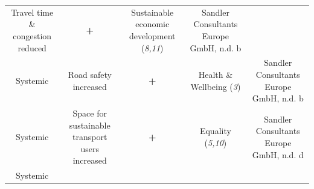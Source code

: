 \documentclass[
]{book}
\begin{document}
\begin{longtable}[]{@{}ccccc@{}}
\begin{minipage}[t]{0.16\columnwidth}
Travel time \& congestion reduced\strut
\end{minipage} & \begin{minipage}[t]{0.17\columnwidth}\centering
\textbf{+}\strut
\end{minipage} & \begin{minipage}[t]{0.17\columnwidth}\centering
Sustainable economic development (\emph{8,11})\strut
\end{minipage} & \begin{minipage}[t]{0.17\columnwidth}\centering
Sandler Consultants Europe GmbH, n.d. b\strut
\end{minipage}\tabularnewline
\begin{minipage}[t]{0.17\columnwidth}\centering
Systemic\strut
\end{minipage} & \begin{minipage}[t]{0.16\columnwidth}\centering
Road safety increased\strut
\end{minipage} & \begin{minipage}[t]{0.17\columnwidth}\centering
\textbf{+}\strut
\end{minipage} & \begin{minipage}[t]{0.17\columnwidth}\centering
Health \& Wellbeing (\emph{3})\strut
\end{minipage} & \begin{minipage}[t]{0.17\columnwidth}\centering
Sandler Consultants Europe GmbH, n.d. b\strut
\end{minipage}\tabularnewline
\begin{minipage}[t]{0.17\columnwidth}\centering
Systemic\strut
\end{minipage} & \begin{minipage}[t]{0.16\columnwidth}\centering
Space for sustainable transport users increased\strut
\end{minipage} & \begin{minipage}[t]{0.17\columnwidth}\centering
\textbf{+}\strut
\end{minipage} & \begin{minipage}[t]{0.17\columnwidth}\centering
Equality (\emph{5,10})\strut
\end{minipage} & \begin{minipage}[t]{0.17\columnwidth}\centering
Sandler Consultants Europe GmbH, n.d. d\strut
\end{minipage}\tabularnewline
\begin{minipage}[t]{0.17\columnwidth}\centering
Systemic\strut
\end{minipage} & \begin{minipage}[t]{0.16\columnwidth}\centering

\end{minipage}
\end{longtable}
\end{document}
